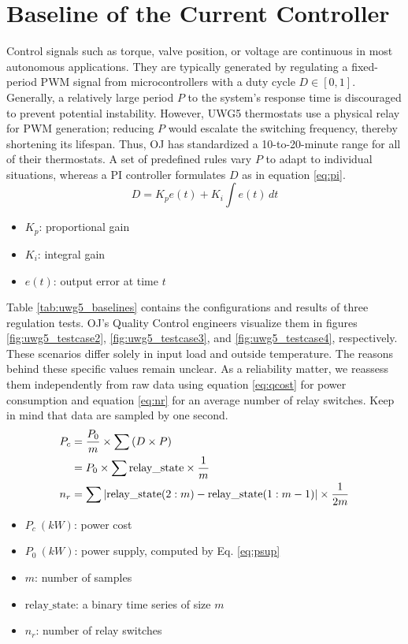 \documentclass[../main.tex]{subfiles}
\begin{document}
\section{Baseline of the Current Controller} \label{sec:env_baseline}
Control signals such as torque, valve position, or voltage are continuous in most autonomous applications. They are typically generated by regulating a fixed-period PWM signal from microcontrollers with a duty cycle $D \in [0,1]$. Generally, a relatively large period $P$ to the system's response time is discouraged to prevent potential instability. However, UWG5 thermostats use a physical relay for PWM generation; reducing $P$ would escalate the switching frequency, thereby shortening its lifespan. Thus, OJ has standardized a 10-to-20-minute range for all of their thermostats. A set of predefined rules vary $P$ to adapt to individual situations, whereas a PI controller formulates $D$ as in equation \ref{eq:pi}.
\begin{equation} \label{eq:pi}
    D = K_p e(t) + K_i \int e(t) \,dt
\end{equation}
\begin{multicols}{2}
\begin{itemize}
    \item $K_p$: proportional gain
    \item $K_i$: integral gain
    \item $e(t)$: output error at time $t$
\end{itemize}
\end{multicols}

Table \ref{tab:uwg5_baselines} contains the configurations and results of three regulation tests. OJ's Quality Control engineers visualize them in figures \ref{fig:uwg5_testcase2}, \ref{fig:uwg5_testcase3}, and \ref{fig:uwg5_testcase4}, respectively. These scenarios differ solely in input load and outside temperature. The reasons behind these specific values remain unclear. As a reliability matter, we reassess them independently from raw data using equation \ref{eq:qcost} for power consumption and equation \ref{eq:nr} for an average number of relay switches. Keep in mind that data are sampled by one second.
\begin{align}
    P_c &= \frac{P_0}{m} \times \sum \left( D \times P \right) \notag \\
    &= P_0 \times \sum \text{relay\_state} \times \frac{1}{m} \label{eq:qcost} \\
    n_r &= \sum \abs{ \text{relay\_state}(2:m) - \text{relay\_state}(1:m-1)} \times \frac{1}{2m} \label{eq:nr}
\end{align}
\begin{multicols}{2}
\begin{itemize}
    \item $P_c~(kW)$: power cost
    \item $P_0~(kW)$: power supply, computed by Eq. \ref{eq:psup}
    \item $m$: number of samples
    \item $\text{relay\_state}$: a binary time series of size $m$
    \item $n_r$: number of relay switches
\end{itemize}
\end{multicols}
\end{document}
